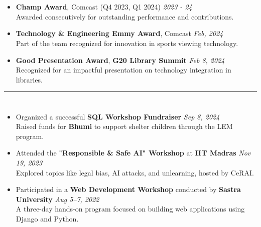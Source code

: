 \documentclass[a4paper,10pt]{article}
\begin{document}
\section{\scshape{}}
\begin{itemize}
    \item \textbf{Champ Award}, Comcast (Q4 2023, Q1 2024) \hfill \textit{2023 - 24}\\
    Awarded consecutively for outstanding performance and contributions.
    \vspace{-2mm}
    \item \textbf{Technology \& Engineering Emmy Award}, Comcast \href{https://corporate.comcast.com/press/releases/comcast-wins-technology-engineering-emmy-innovation-sports-viewing}{} \hfill \textit{Feb, 2024}\\
    Part of the team recognized for innovation in sports viewing technology. 
    \vspace{-2mm}
    \item \textbf{Good Presentation Award}, \textbf{G20 Library Summit} \href{https://www.linkedin.com/posts/a-shreehari_ml-huggingface-g20librarysummit-activity-7163032877201371137-ZS8n?utm_source=share&utm_medium=member_desktop}{} \hfill \textit{Feb 8, 2024}\\
    Recognized for an impactful presentation on technology integration in libraries.
\end{itemize}

\hrule
\section{\scshape\color{Fuchsia}{\faBookOpen \ \textbf WORKSHOPS}}
\begin{itemize}
    \item Organized a successful \textbf{SQL Workshop Fundraiser} \href{https://www.linkedin.com/posts/a-shreehari_fundraiser-sqlworkshop-communitysupport-activity-7239111496339746816-VhVM?utm_source=share&utm_medium=member_desktop}{} \hfill \textit{Sep 8, 2024}\\ Raised funds for \textbf{Bhumi} to support shelter children through the LEM program.
    \vspace{-2mm}
    \item Attended the \textbf{"Responsible \& Safe AI" Workshop} at \textbf{IIT Madras} \href{https://www.linkedin.com/posts/activity-7132008217424916480-G6g2?utm_source=share&utm_medium=member_desktop}{} \hfill \textit{Nov 19, 2023} \\ 
    Explored topics like legal bias, AI attacks, and unlearning, hosted by CeRAI.
    \vspace{-2mm}
    \item Participated in a \textbf{Web Development Workshop} conducted by \textbf{Sastra University} \hfill \textit{Aug 5–7, 2022} \\
    A three-day hands-on program focused on building web applications using Django and Python.
\end{itemize}
\end{document}
